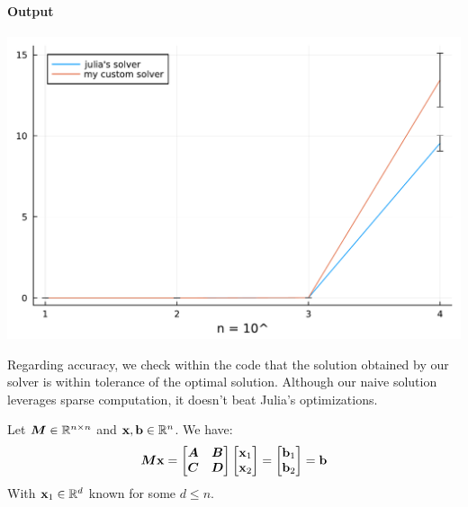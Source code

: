 \documentclass[]{exam}
\let\oldparagraph\paragraph
\renewcommand{\paragraph}[1]{\oldparagraph{#1}\mbox{}}
\begin{document}
\begin{questions}
\begin{enumerate}[label=\arabic*.]
		\paragraph{Output}
		\begin{center}
			\includegraphics[width=.7\textwidth]{code/q2-2.pdf}
		\end{center}
		Regarding accuracy, we check within the code that the solution obtained by our solver is within tolerance of the optimal solution. Although our naive solution leverages sparse computation, it doesn't beat Julia's optimizations.
\end{enumerate}

\newpage
\question
\hfill

Let $\boldsymbol{M} \in \mathbb{R}^{n \times n}$ and $\boldsymbol{\mathrm{x}}, \boldsymbol{\mathrm{b}} \in \mathbb{R}^n$. We have:
\begin{equation*}
	\boldsymbol{M} \boldsymbol{\mathrm{x}} = \begin{bmatrix} \boldsymbol{A} & \boldsymbol{B} \\ \boldsymbol{C} & \boldsymbol{D} \end{bmatrix} \begin{bmatrix} \boldsymbol{\mathrm{x}}_1 \\ \boldsymbol{\mathrm{x}}_2 \end{bmatrix} = \begin{bmatrix} \boldsymbol{\mathrm{b}}_1 \\ \boldsymbol{\mathrm{b}}_2 \end{bmatrix} = \boldsymbol{\mathrm{b}}
\end{equation*}
With $\boldsymbol{\mathrm{x}}_1 \in \mathbb{R}^d$ known for some $d \leq n$.


\end{questions}
\end{document}
